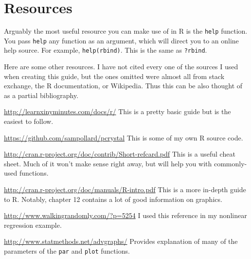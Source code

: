 \documentclass[12pt]{article}
\theoremstyle{remark}
\begin{document}

\clearpage
\section{Resources}
Arguably the most useful resource you can make use of in R is the \verb|help| function. You pass \verb|help| any function as an argument, which will direct you to an online help source. For example, \verb|help(rbind)|. This is the same as \verb|?rbind|.

Here are some other resources. I have not cited every one of the sources I used when creating this guide, but the ones omitted were almost all from stack exchange, the R documentation, or Wikipedia. Thus this can be also thought of as a partial bibliography.
\begingroup
\renewcommand{\section}[2]{}%
\begin{thebibliography}{}
		\url{http://learnxinyminutes.com/docs/r/}
		This is a pretty basic guide but is the easiest to follow.
		
		\url{https://github.com/sampollard/pcrystal}
		This is some of my own R source code.
		
		\url{http://cran.r-project.org/doc/contrib/Short-refcard.pdf}
		This is a useful cheat sheet. Much of it won't make sense right away, but will help you with commonly-used functions.
		
		\url{http://cran.r-project.org/doc/manuals/R-intro.pdf}
		This is a more in-depth guide to R. Notably, chapter 12 contains a lot of good information on graphics.
	
		\url{http://www.walkingrandomly.com/?p=5254}
		I used this reference in my nonlinear regression example.
		
		\url{http://www.statmethods.net/advgraphs/} Provides explanation of many of the parameters of the \verb|par| and \verb|plot| functions.
\end{thebibliography}
\endgroup
\end{document}
